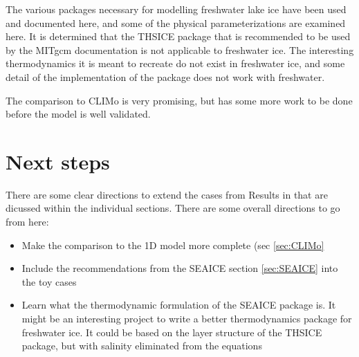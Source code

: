 \documentclass[11pt]{article}
\begin{document}
The various packages necessary for modelling freshwater lake ice have been used and documented here, and some of the physical parameterizations are examined here. It is determined that the THSICE package that is recommended to be used by the MITgcm documentation is not applicable to freshwater ice. The interesting thermodynamics it is meant to recreate do not exist in freshwater ice, and some detail of the implementation of the package does not work with freshwater.

The comparison to CLIMo is very promising, but has some more work to be done before the model is well validated.

\section{Next steps}
There are some clear directions to extend the cases from Results in that are dicussed within the individual sections. There are some overall directions to go from here:
\begin{itemize}
\item{Make the comparison to the 1D model more complete (sec \ref{sec:CLIMo}}
\item{Include the recommendations from the SEAICE section \ref{sec:SEAICE} into the toy cases}
\item{Learn what the thermodynamic formulation of the SEAICE package is. It might be an interesting project to write a better thermodynamics package for freshwater ice. It could be based on the layer structure of the THSICE package, but with salinity eliminated from the equations}
\end{itemize}


\end{document}
